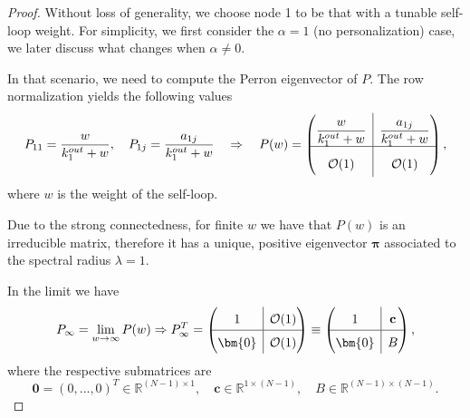 \documentclass[sn-mathphys-ay]{sn-jnl}%
\newcommand{\rvline}{\hspace*{-\arraycolsep}\vline\hspace*{-\arraycolsep}}
\newcommand{\R}{\mathbb{R}}
\newcommand{\bc}{\mathbf{c}}
\theoremstyle{thmstyleone}%
\theoremstyle{thmstyletwo}%
\theoremstyle{thmstylethree}%
\begin{document}
\begin{proof}
	Without loss of generality, we choose node 1 to be that with a tunable self-loop weight. For simplicity, we first consider the $\alpha=1$ (no personalization) case, we later discuss what changes when $\alpha \neq 0$.
	
	
	In that scenario, we need to compute the Perron eigenvector of $P$. The row normalization yields the following values
	\begin{equation}
		P_{11}=\frac{w}{k_1^{out}+w}, \quad P_{1j} = \frac{a_{1j}}{k_1^{out}+w}
		\quad \Rightarrow \quad P(w)=
		{
			\renewcommand*{\arraystretch}{2}
			\begin{pmatrix}
				\dfrac{w}{k_1^{out} + w} & \rvline & \dfrac{a_{1j}}{k_1^{out}+w} \\
				\hline
				\mathcal{O}(1) & \rvline & \mathcal{O}(1)
			\end{pmatrix},
		}
	\end{equation}
	where $w$ is the weight of the self-loop.
	
	Due to the strong connectedness, for finite $w$ we have that $P(w)$ is an irreducible matrix, therefore it has a unique, positive eigenvector $\bm{\pi}$ associated to the spectral radius $\lambda=1$. 
	
	In the limit we have
	\begin{equation}
		P_\infty=\lim_{w\rightarrow\infty} P(w) \Rightarrow 
		P_\infty^T = 
		{
			\renewcommand*{\arraystretch}{1.5}
			\begin{pmatrix}
				1 & \rvline & \mathcal{O}(1) \\
				\hline
				\bm{0} & \rvline & \mathcal{O}(1)
			\end{pmatrix}\equiv
			\begin{pmatrix}
				1 & \rvline & \bc \\
				\hline
				\bm{0} & \rvline & B
			\end{pmatrix}, 
		}
	\end{equation}
	where the respective submatrices are
	\begin{equation}
		\bm{0}=
		(0,\dots, 0)^T
		\in\R^{(N-1)\times 1}, \quad \bc\in\R^{1\times(N-1)}, \quad B\in\R^{(N-1)\times(N-1)}.
	\end{equation}
	

\end{proof}
\end{document}
